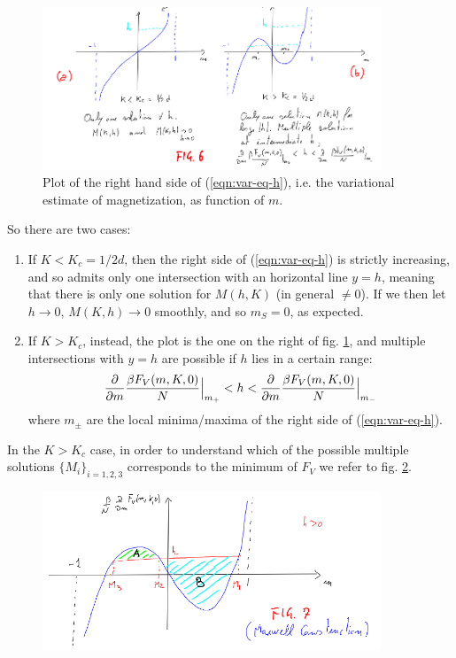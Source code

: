 \documentclass[../../main.tex]{subfiles}
\begin{document}
\begin{figure}[H]
    \centering
    \includegraphics[width=0.9\textwidth]{hplot.png}
    \caption{Plot of the right hand side of (\ref{eqn:var-eq-h}), i.e. the variational estimate of magnetization,
as function of $m$.} %
    \label{fig:hplot}
\end{figure}

So there are two cases:
\begin{enumerate}
    \item If $K < K_c = 1/2d$, then the right side of (\ref{eqn:var-eq-h}) is strictly increasing, and so admits only one intersection with an horizontal line $y = h$, meaning that there is only one solution for $M(h,K)$ (in general $\neq 0$). If we then let $h \to 0$, $M(K,h) \to 0$ smoothly, and so $m_S = 0$, as expected. 
    \item If $K > K_c$, instead, the plot is the one on the right of fig. \ref{fig:hplot}, and multiple intersections with $y=h$ are possible if $h$ lies in a certain range:
    \begin{align*}
        \pdv{m} \frac{\beta F_V(m,K,0)}{N} \Big|_
        {m_+} < h < \pdv{m} \frac{\beta F_V(m,K,0) }{N}\Big|_{m_-}
    \end{align*}
    where $m_\pm$ are the local minima/maxima of the right side of (\ref{eqn:var-eq-h}).
\end{enumerate}

In the $K>K_c$ case, in order to understand which of the possible multiple solutions $\{M_i\}_{i=1,2,3}$ corresponds to the minimum of $F_V$ we refer to fig. \ref{fig:variational_energy_h}.

\begin{figure}[H]
    \centering
    \includegraphics[width=0.9\textwidth]{variational_energy_h.png}
    \caption{} %
    \label{fig:variational_energy_h}
\end{figure}
\end{document}
